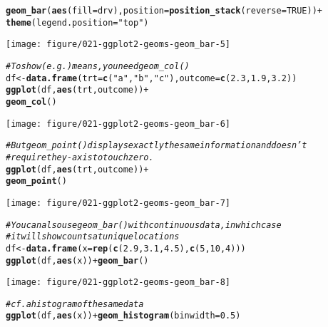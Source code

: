 \documentclass[a4paper,titlepage]{tufte-handout}\usepackage[]{graphicx}\usepackage[]{xcolor}
\makeatletter
\def\maxwidth{ %
  \ifdim\Gin@nat@width>\linewidth
    \linewidth
  \else
    \Gin@nat@width
  \fi
}
\newcommand{\hlnum}[1]{\textcolor[rgb]{0.686,0.059,0.569}{#1}}%
\newcommand{\hlsng}[1]{\textcolor[rgb]{0.192,0.494,0.8}{#1}}%
\newcommand{\hlcom}[1]{\textcolor[rgb]{0.678,0.584,0.686}{\textit{#1}}}%
\newcommand{\hlopt}[1]{\textcolor[rgb]{0,0,0}{#1}}%
\newcommand{\hldef}[1]{\textcolor[rgb]{0.345,0.345,0.345}{#1}}%
\newcommand{\hlkwb}[1]{\textcolor[rgb]{0.69,0.353,0.396}{#1}}%
\newcommand{\hlkwc}[1]{\textcolor[rgb]{0.333,0.667,0.333}{#1}}%
\newcommand{\hlkwd}[1]{\textcolor[rgb]{0.737,0.353,0.396}{\textbf{#1}}}%
\newenvironment{kframe}{%
 \def\at@end@of@kframe{}%
 \ifinner\ifhmode%
  \def\at@end@of@kframe{\end{minipage}}%
  \begin{minipage}{\columnwidth}%
 \fi\fi%
 \def\FrameCommand##1{\hskip\@totalleftmargin \hskip-\fboxsep
 \colorbox{shadecolor}{##1}\hskip-\fboxsep
     \hskip-\linewidth \hskip-\@totalleftmargin \hskip\columnwidth}%
 \MakeFramed {\advance\hsize-\width
   \@totalleftmargin\z@ \linewidth\hsize
   \@setminipage}}%
 {\par\unskip\endMakeFramed%
 \at@end@of@kframe}
\newenvironment{knitrout}{}{} %
\makeatother
\begin{document}
\begin{knitrout}
\begin{kframe}
\begin{alltt}
 \hlkwd{geom_bar}\hldef{(}\hlkwd{aes}\hldef{(}\hlkwc{fill} \hldef{= drv),} \hlkwc{position} \hldef{=} \hlkwd{position_stack}\hldef{(}\hlkwc{reverse} \hldef{=} \hlnum{TRUE}\hldef{))} \hlopt{+}
 \hlkwd{theme}\hldef{(}\hlkwc{legend.position} \hldef{=} \hlsng{"top"}\hldef{)}
\end{alltt}
\end{kframe}
\texttt{[image: figure/021-ggplot2-geoms-geom\_bar-5]} 
\begin{kframe}\begin{alltt}
\hlcom{# To show (e.g.) means, you need geom_col()}
\hldef{df} \hlkwb{<-} \hlkwd{data.frame}\hldef{(}\hlkwc{trt} \hldef{=} \hlkwd{c}\hldef{(}\hlsng{"a"}\hldef{,} \hlsng{"b"}\hldef{,} \hlsng{"c"}\hldef{),} \hlkwc{outcome} \hldef{=} \hlkwd{c}\hldef{(}\hlnum{2.3}\hldef{,} \hlnum{1.9}\hldef{,} \hlnum{3.2}\hldef{))}
\hlkwd{ggplot}\hldef{(df,} \hlkwd{aes}\hldef{(trt, outcome))} \hlopt{+}
  \hlkwd{geom_col}\hldef{()}
\end{alltt}
\end{kframe}
\texttt{[image: figure/021-ggplot2-geoms-geom\_bar-6]} 
\begin{kframe}\begin{alltt}
\hlcom{# But geom_point() displays exactly the same information and doesn't}
\hlcom{# require the y-axis to touch zero.}
\hlkwd{ggplot}\hldef{(df,} \hlkwd{aes}\hldef{(trt, outcome))} \hlopt{+}
  \hlkwd{geom_point}\hldef{()}
\end{alltt}
\end{kframe}
\texttt{[image: figure/021-ggplot2-geoms-geom\_bar-7]} 
\begin{kframe}\begin{alltt}
\hlcom{# You can also use geom_bar() with continuous data, in which case}
\hlcom{# it will show counts at unique locations}
\hldef{df} \hlkwb{<-} \hlkwd{data.frame}\hldef{(}\hlkwc{x} \hldef{=} \hlkwd{rep}\hldef{(}\hlkwd{c}\hldef{(}\hlnum{2.9}\hldef{,} \hlnum{3.1}\hldef{,} \hlnum{4.5}\hldef{),} \hlkwd{c}\hldef{(}\hlnum{5}\hldef{,} \hlnum{10}\hldef{,} \hlnum{4}\hldef{)))}
\hlkwd{ggplot}\hldef{(df,} \hlkwd{aes}\hldef{(x))} \hlopt{+} \hlkwd{geom_bar}\hldef{()}
\end{alltt}
\end{kframe}
\texttt{[image: figure/021-ggplot2-geoms-geom\_bar-8]} 
\begin{kframe}\begin{alltt}
\hlcom{# cf. a histogram of the same data}
\hlkwd{ggplot}\hldef{(df,} \hlkwd{aes}\hldef{(x))} \hlopt{+} \hlkwd{geom_histogram}\hldef{(}\hlkwc{binwidth} \hldef{=} \hlnum{0.5}\hldef{)}

\end{alltt}
\end{kframe}
\end{knitrout}
\end{document}
